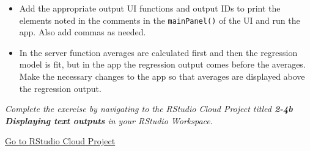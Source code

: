 \documentclass[
  letterpaper,
  DIV=11,
  numbers=noendperiod]{scrreprt}
\providecommand{\tightlist}{%
  \setlength{\itemsep}{0pt}\setlength{\parskip}{0pt}}
\begin{document}
\begin{itemize}
\tightlist
\item
  Add the appropriate output UI functions and output IDs to print the
  elements noted in the comments in the \texttt{mainPanel()} of the UI
  and run the app. Also add commas as needed.
\item
  In the server function averages are calculated first and then the
  regression model is fit, but in the app the regression output comes
  before the averages. Make the necessary changes to the app so that
  averages are displayed above the regression output.
\end{itemize}

\emph{Complete the exercise by navigating to the RStudio Cloud Project
titled \textbf{2-4b Displaying text outputs} in your RStudio Workspace}.

\href{https://rstudio.cloud/spaces/81721/join?access_code=I4VJaNsKfTqR3Td9hLP7E1nz8\%2FtMg6Xbw9Bgqumv}{
Go to RStudio Cloud Project}
\end{document}
